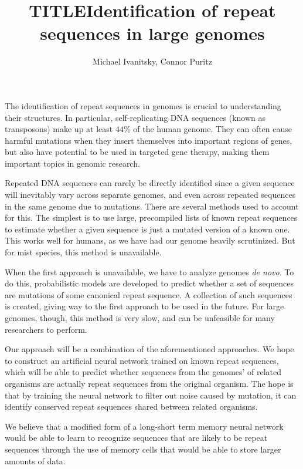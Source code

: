 \documentclass{article}
\date{}
\title{TITLE}
\author{Michael Ivanitsky, Connor Puritz}
\title{Identification of repeat sequences in large genomes}
\begin{document}
\maketitle
The identification of repeat sequences in genomes is crucial to understanding their structures. In particular, self-replicating DNA sequences (known as transposons) make up at least $44\%$ of the human genome. They can often cause harmful mutations when they insert themselves into important regions of genes, but also have potential to be used in targeted gene therapy, making them important topics in genomic research.

Repeated DNA sequences can rarely be directly identified since a given sequence will inevitably vary across separate genomes, and even across repeated sequences in the same genome due to mutations. There are several methods used to account for this. The simplest is to use large, precompiled lists of known repeat sequences to estimate whether a given sequence is just a mutated version of a known one. This works well for humans, as we have had our genome heavily scrutinized. But for mist species, this method is unavailable.

When the first approach is unavailable, we have to analyze genomes \textit{de novo}. To do this, probabilistic models are developed to predict whether a set of sequences are mutations of some canonical repeat sequence. A collection of such sequences is created, giving way to the first approach to be used in the future. For large genomes, though, this method is very slow, and can be unfeasible for many researchers to perform.

Our approach will be a combination of the aforementioned approaches. We hope to construct an artificial neural network trained on known repeat sequences, which will be able to predict whether sequences from the genomes' of related organisms are actually repeat sequences from the original organism. The hope is that by training the neural network to filter out noise caused by mutation, it can identify conserved repeat sequences shared between related organisms.

We believe that a modified form of a long-short term memory neural network would be able to learn to recognize sequences that are likely to be repeat sequences through the use of memory cells that would be able to store larger amounts of data.
\end{document}

